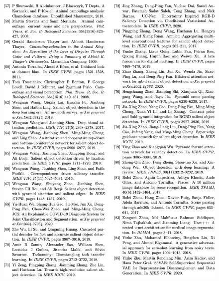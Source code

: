 \documentclass[final]{cvpr}
\begin{document}
\begin{figure}[tp]
    \centering
    \includegraphics[width=\textwidth]{COD_Zh_translate/figures/ref3.png}\small
\end{figure}

% 
% 

\end{document}
